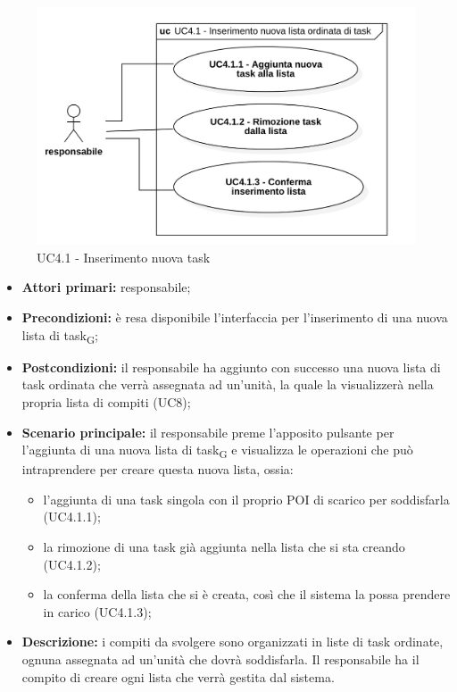 \begin{figure}[H]
	\centering
	\includegraphics[scale=0.52]{res/images/uc4-1.png}
	\caption{UC4.1 - Inserimento nuova task}
\end{figure}

\begin{itemize}
	\item 	\textbf{Attori primari:} responsabile;
	\item 	\textbf{Precondizioni:} è resa disponibile l'interfaccia per l'inserimento di una nuova lista di task\textsubscript{G}; 
	\item 	\textbf{Postcondizioni:} il responsabile ha aggiunto con successo una nuova lista di task ordinata che verrà assegnata ad un'unità, la quale la visualizzerà nella propria lista di compiti (UC8);
	\item 	\textbf{Scenario principale:} il responsabile preme l'apposito pulsante per l'aggiunta di una nuova lista di task\textsubscript{G} e visualizza le operazioni che può intraprendere per creare questa nuova lista, ossia:
	\begin{itemize}
		\item l'aggiunta di una task singola con il proprio POI di scarico per soddisfarla (UC4.1.1);
		\item la rimozione di una task già aggiunta nella lista che si sta creando (UC4.1.2);
		\item la conferma della lista che si è creata, così che il sistema la possa prendere in carico (UC4.1.3);
	\end{itemize}
	\item 	\textbf{Descrizione:} i compiti da svolgere sono organizzati in liste di task ordinate, ognuna assegnata ad un'unità che dovrà soddisfarla. Il responsabile ha il compito di creare ogni lista che verrà gestita dal sistema.
\end{itemize}

